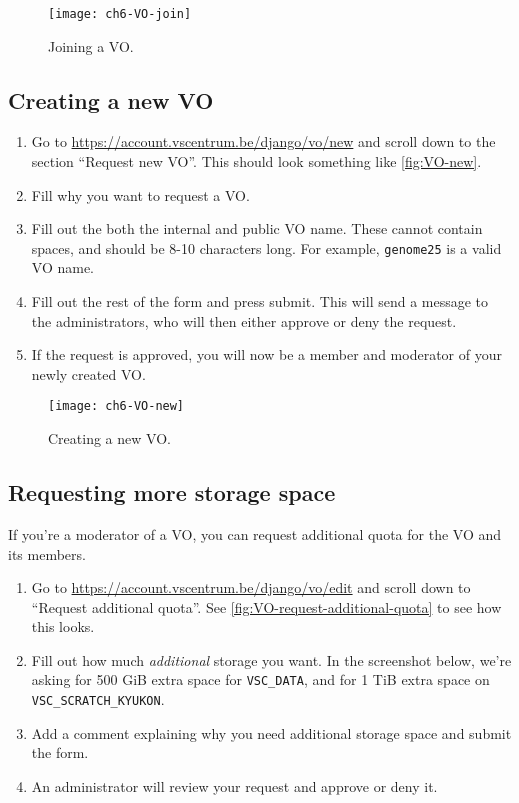 \begin{figure}[!htbp]
  \caption{Joining a VO.}
  \centering
    \texttt{[image: ch6-VO-join]}
\end{figure}\label{fig:VO-join}

\subsection{Creating a new VO}

\begin{enumerate}
    \item Go to \url{https://account.vscentrum.be/django/vo/new} and scroll down
        to the section ``Request new VO''. This should look something like
        \autoref{fig:VO-new}.
    \item Fill why you want to request a VO.
    \item Fill out the both the internal and public VO name. These cannot contain
        spaces, and should be 8-10 characters long. For example, \lstinline|genome25| is
        a valid VO name.
    \item Fill out the rest of the form and press submit. This will send a message
        to the \hpc administrators, who will then either approve or deny the request.
    \item If the request is approved, you will now be a member and moderator of your
        newly created VO.
\end{enumerate}

\begin{figure}[!htbp]
  \caption{Creating a new VO.}
  \centering
    \texttt{[image: ch6-VO-new]}
\end{figure}\label{fig:VO-new}

\subsection{Requesting more storage space}
\label{subsec:requesting-more-storage-space}

If you're a moderator of a VO, you can request additional quota for the VO and
its members.

\begin{enumerate}
    \item Go to \url{https://account.vscentrum.be/django/vo/edit} and scroll down
        to ``Request additional quota''. See \autoref{fig:VO-request-additional-quota} to see how this looks.
    \item Fill out how much \emph{additional} storage you want. In the screenshot below,
        we're asking for 500 GiB extra space for \lstinline|VSC_DATA|, and for 1 TiB extra
        space on \lstinline|VSC_SCRATCH_KYUKON|.
    \item Add a comment explaining why you need additional storage space and submit
        the form.
    \item An \hpc administrator will review your request and approve or deny it.
\end{enumerate}

